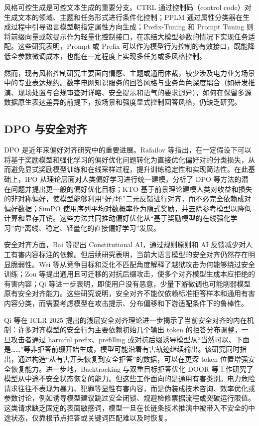 \documentclass[fontset=fandol,type=master,campus=shenzhen,etitleauto=true]{hithesisbook}
\begin{document}
风格可控生成是可控文本生成的重要分支。CTRL 通过控制码（control code）对生成文本的领域、主题和任务形式进行条件化控制\cite{ref36}；PPLM 通过属性分类器在生成过程中引导语言模型朝指定属性方向生成\cite{ref37}；Prefix-Tuning 和 Prompt Tuning 则将前缀向量或软提示作为轻量化控制接口，在冻结大模型参数的情况下实现任务适配\cite{ref38,ref39}。这些研究表明，Prompt 或 Prefix 可以作为模型行为控制的有效接口，既能降低全参数微调成本，也能在一定程度上实现多任务或多风格控制。

然而，现有风格控制研究主要面向情感、主题或通用体裁，较少涉及电力业务场景中的专业表达规约。数字电网知识服务的回答风格与业务角色深度耦合（如研发推演、现场处置与合规审查对详略、安全提示和语气的要求迥异），如何在保留多源数据原生表达差异的前提下，按场景和强度显式控制回答风格，仍缺乏研究。

\subsection{DPO 与安全对齐}

DPO 是近年来偏好对齐研究中的重要进展。Rafailov 等指出，在一定假设下可以将基于奖励模型和强化学习的偏好优化问题转化为直接优化偏好对的分类损失，从而避免显式奖励模型训练和在线采样过程，提升训练稳定性和实现简洁性\cite{ref40}。在此基础上，IPO 从理论层面对人类偏好学习进行统一建模，分析了 DPO 等方法的潜在问题并提出更一般的偏好优化目标\cite{ref41}；KTO 基于前景理论建模人类对收益和损失的非对称偏好，使模型能够利用“好/坏”二元反馈进行对齐，而不必完全依赖成对偏好数据\cite{ref42}；SimPO 使用序列平均对数概率作为隐式奖励，并去除参考模型以降低计算和显存开销\cite{ref43}。这些方法共同推动偏好优化从“基于奖励模型的在线强化学习”向“离线、稳定、轻量化的直接偏好学习”发展。

安全对齐方面，Bai 等提出 Constitutional AI，通过规则原则和 AI 反馈减少对人工有害内容标注的依赖\cite{ref44}。但后续研究表明，当前大语言模型的安全对齐仍然存在明显脆弱性。Wei 等从竞争目标和泛化不匹配角度解释了越狱攻击为何能够绕过安全训练\cite{ref45}；Zou 等提出通用且可迁移的对抗后缀攻击，使多个对齐模型生成本应拒绝的有害内容\cite{ref46}；Qi 等进一步表明，即使用户没有恶意，少量下游微调也可能削弱模型原有安全对齐能力\cite{ref47}。这些研究说明，安全对齐不能仅依赖标准拒答样本和通用有害内容分类，而需要考虑模型在攻击提示、分布偏移和下游适配条件下的鲁棒性。

Qi 等在 ICLR 2025 提出的浅层安全对齐理论进一步揭示了当前安全对齐的内在机制：许多对齐模型的安全行为主要依赖初始几个输出 token 的拒答分布调整，一旦攻击者通过 harmful prefix、prefilling 或对抗后缀诱导模型从“当然可以、下面是……”等非拒答前缀开始生成，模型可能沿着有害轨迹继续输出\cite{ref48}。该研究同时指出，通过构造“从有害开头恢复到安全拒答”的数据，可以在更深 token 位置增强安全恢复能力。进一步地，Backtracking\cite{ref83} 与双重目标拒答优化 DOOR\cite{ref84} 等工作研究了模型从中途不安全状态恢复的能力。但这些工作面向的是通用有害类别。电力危险请求往往不表现为暴力、犯罪等显性有害内容，而是伪装成技术咨询、效率优化或参数讨论，例如诱导模型建议跳过安全闭锁、规避检修票据流程或突破运行限值。这类请求缺乏固定的表面敏感词，模型一旦在长链条技术推演中被带入不安全的中途状态，仅靠根节点拒答或关键词匹配难以及时恢复。
\end{document}
